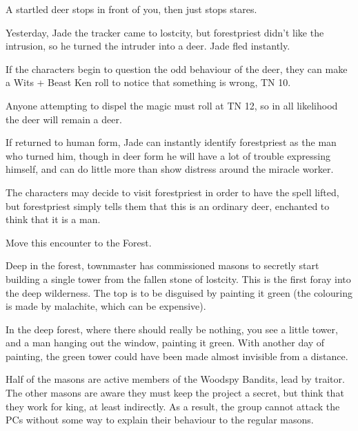 \begin{multicols}{2}
\begin{boxtext}
	A startled deer stops in front of you, then just stops stares.

\end{boxtext}

Yesterday, Jade the tracker came to \gls{lostcity}, but \gls{forestpriest} didn't like the intrusion, so he turned the intruder into a deer.
Jade fled instantly.

If the characters begin to question the odd behaviour of the deer, they can make a Wits + Beast Ken roll to notice that something is wrong, TN 10.

Anyone attempting to dispel the magic must roll at TN 12, so in all likelihood the deer will remain a deer.


If returned to human form, Jade can instantly identify \gls{forestpriest} as the man who turned him, though in deer form he will have a lot of trouble expressing himself, and can do little more than show distress around the miracle worker.

The characters may decide to visit \gls{forestpriest} in order to have the spell lifted, but \gls{forestpriest} simply tells them that this is an ordinary deer, enchanted to think that it is a man.

Move this encounter to the Forest.


Deep in the forest, \gls{townmaster} has commissioned masons to secretly start building a single tower from the fallen stone of \gls{lostcity}.
This is the first foray into the deep wilderness.
The top is to be disguised by painting it green (the colouring is made by malachite, which can be expensive).

\begin{boxtext}

	In the deep forest, where there should really be nothing, you see a little tower, and a man hanging out the window, painting it green.
	With another day of painting, the green tower could have been made almost invisible from a distance.

\end{boxtext}

Half of the masons are active members of the Woodspy Bandits, lead by \gls{traitor}.
The other masons are aware they must keep the project a secret, but think that they work for \gls{king}, at least indirectly.
As a result, the group cannot attack the PCs without some way to explain their behaviour to the regular masons.


\end{multicols}
